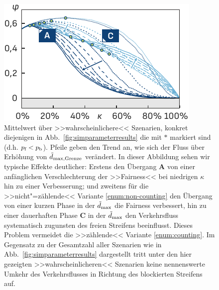 \begin{figure}%
\centering
\includegraphics{content/bottleneck/images/tuev-engstelle-simulation-ergebnisse-kamo}%
\caption{Mittelwert über >>wahrscheinlichere<< Szenarien, konkret diejenigen in Abb.~\ref{fig:simparameterresults} die mit \textcolor{colorPRGreen}{$*$} markiert sind (d.h. $p_{\text{f}} < p_{\text{b}}$). Pfeile geben den Trend an, wie sich der Fluss über Erhöhung von $\tilde{d}_{\text{max,Grenze}}$ verändert. In dieser Abbildung sehen wir typische Effekte deutlicher: Erstens den Übergang \textbf{A} von einer anfänglichen Verschlechterung der >>Fairness<< bei niedrigen $\kappa$ hin zu einer Verbesserung; und zweitens für die >>nicht"=zählende<< Variante \ref{enum:non-counting} den Übergang von einer kurzen Phase in der $\tilde{d}_{\text{max}}$ die Fairness verbessert, hin zu einer dauerhaften Phase \textbf{C} in der $\tilde{d}_{\text{max}}$ den Verkehrsfluss systematisch zugunsten des freien Streifens beeinflusst. Dieses Problem vermeidet die >>zählende<< Variante \ref{enum:counting}. Im Gegensatz zu der Gesamtzahl aller Szenarien wie in Abb.~\ref{fig:simparameterresults} dargestellt tritt unter den hier gezeigten >>wahrscheinlicheren<< Szenarien keine nennenswerte Umkehr des Verkehrsflusses in Richtung des blockierten Streifens auf.}%
\label{fig:simparameterresults-accumulated}%
\end{figure}




%
%







